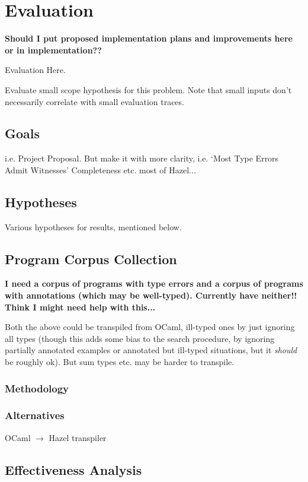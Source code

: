 \chapter{Evaluation}\label{chap:Evaluation}
\textbf{Should I put proposed implementation plans and improvements here or in implementation??}

Evaluation Here.\par 
Evaluate small scope hypothesis for this problem. Note that small inputs don't necessarily correlate with small evaluation traces.

\section{Goals}\label{sec:EvaluationGoals}
i.e. Project Proposal. But make it with more clarity, i.e. `Most Type Errors Admit Witnesses'
Completeness etc. most of Hazel...

\section{Hypotheses}
Various hypotheses for results, mentioned below.

\section{Program Corpus Collection}\label{sec:CorpusCollection}
\textbf{I need a corpus of programs with type errors and a corpus of programs with annotations (which may be well-typed). Currently have neither!! Think I might need help with this...}

Both the above could be transpiled from OCaml, ill-typed ones by just ignoring all types (though this adds some bias to the search procedure, by ignoring partially annotated examples or annotated but ill-typed situations, but it \textit{should} be roughly ok). But sum types etc. may be harder to transpile.
\subsection{Methodology}
\subsection{Alternatives}
OCaml $\to$ Hazel transpiler

\section{Effectiveness Analysis}\label{sec:EffectivenessAnalysis}

